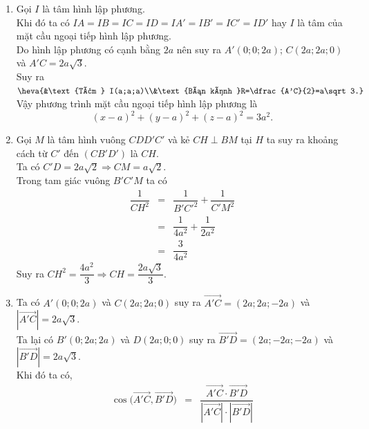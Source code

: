 \begin{bt}
{\begin{center}
		\end{center}
		\begin{enumerate}
			\item Gọi $I$ là tâm hình lập phương.\\
			Khi đó ta có $IA=IB=IC=ID=IA'=IB'=IC'=ID'$ hay $I$ là tâm của mặt cầu ngoại tiếp hình lập phương.\\
			Do hình lập phương có cạnh bằng $2a$ nên suy ra $A'(0;0;2a)$; $C(2a;2a;0)$ và  $A'C=2a\sqrt 3$.\\
			Suy ra $\heva{&\text{Tâm } I(a;a;a)\\&\text{Bán kính }R=\dfrac{A'C}{2}=a\sqrt 3.}$\\
			Vậy phương trình mặt cầu ngoại tiếp hình lập phương là
			\[(x-a)^2+(y-a)^2+(z-a)^2=3a^2.\]
			\item Gọi $M$ là tâm hình vuông $CDD'C'$ và kẻ $CH\perp BM$ tại $H$ ta suy ra khoảng cách từ $C'$ đến $(CB'D')$ là $CH$.\\
			Ta có $C'D=2a\sqrt 2 \Rightarrow CM=a\sqrt 2$.\\
			Trong tam giác vuông $B'C'M$ ta có
			\allowdisplaybreaks
			\begin{eqnarray*}
				\dfrac{1}{CH^2}&=&\dfrac{1}{B'C'^2}+\dfrac{1}{C'M^2}\\
				&=&\dfrac{1}{4a^2}+\dfrac{1}{2a^2}\\
				&=&\dfrac{3}{4a^2}
			\end{eqnarray*}
			Suy ra $CH^2=\dfrac{4a^2}{3}\Rightarrow CH=\dfrac{2a\sqrt 3}{3}$.
			\item Ta có $A'(0;0;2a)$ và $C(2a;2a;0)$ suy ra $\overrightarrow{A'C}=(2a;2a;-2a)$ và $\left|\overrightarrow{A'C}\right|=2a\sqrt 3$.\\
			Ta lại có $B'(0;2a;2a)$ và $D(2a;0;0)$ suy ra $\overrightarrow{B'D}=(2a;-2a;-2a)$ và $\left|\overrightarrow{B'D}\right|=2a\sqrt 3$.\\
			Khi đó ta có,
			\allowdisplaybreaks
			\begin{eqnarray*}
				\cos\Big(\overrightarrow{A'C},\overrightarrow{B'D}\Big)&=&\dfrac{\overrightarrow{A'C}\cdot \overrightarrow{B'D}}{\left|\overrightarrow{A'C}\right|\cdot \left|\overrightarrow{B'D}\right|}\\

\end{eqnarray*}
\end{enumerate}}
\end{bt}

